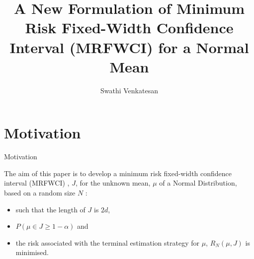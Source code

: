 \documentclass [xcolor=svgnames, t] {beamer}
\title[]{A New Formulation of Minimum Risk Fixed-Width Confidence
Interval (MRFWCI) for a Normal Mean}
\institute[]{Department of Statistics \\ University of Connecticut}
\author[]{ Swathi Venkatesan }
\date{}
\begin{document}
\begin{frame}
\maketitle
\end{frame}






\section{Motivation}
\begin{frame}{Motivation}
  \vspace{5mm}

The aim of this paper is to develop a minimum risk fixed-width confidence interval
(MRFWCI) , $J$, for the unknown mean, $\mu$ of a Normal Distribution, based on a random size $N$  :
\begin{itemize}
\item such that the length of $J$ is $2d$,
\item $P(\mu \in J \geq 1-\alpha)$ and
\item the risk associated with the terminal estimation strategy for $\mu$, $R_N(\mu,J)$ is minimised.
\end{itemize}

\end{frame}
\end{document}
